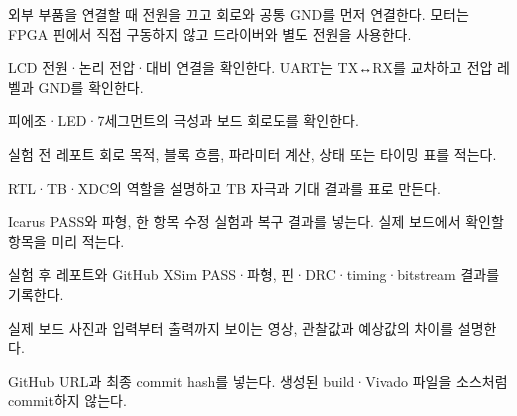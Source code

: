 \begin{frame}{외부 부품을 연결할 때}
\small
전원을 끄고 회로와 공통 GND를 먼저 연결한다. 모터는 FPGA 핀에서 직접 구동하지 않고 드라이버와 별도 전원을 사용한다.\par\vspace{0.28cm}
LCD 전원·논리 전압·대비 연결을 확인한다. UART는 TX↔RX를 교차하고 전압 레벨과 GND를 확인한다.\par\vspace{0.28cm}
피에조·LED·7세그먼트의 극성과 보드 회로도를 확인한다.
\end{frame}
\begin{frame}[label=reports]{실험 전 레포트}
\small
회로 목적, 블록 흐름, 파라미터 계산, 상태 또는 타이밍 표를 적는다.\par\vspace{0.25cm}
RTL·TB·XDC의 역할을 설명하고 TB 자극과 기대 결과를 표로 만든다.\par\vspace{0.25cm}
Icarus PASS와 파형, 한 항목 수정 실험과 복구 결과를 넣는다. 실제 보드에서 확인할 항목을 미리 적는다.
\end{frame}
\begin{frame}{실험 후 레포트와 GitHub}
\small
XSim PASS·파형, 핀·DRC·timing·bitstream 결과를 기록한다.\par\vspace{0.25cm}
실제 보드 사진과 입력부터 출력까지 보이는 영상, 관찰값과 예상값의 차이를 설명한다.\par\vspace{0.25cm}
GitHub URL과 최종 commit hash를 넣는다. 생성된 build·Vivado 파일을 소스처럼 commit하지 않는다.
\end{frame}

